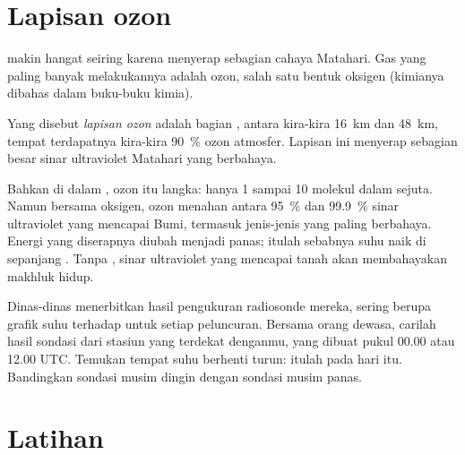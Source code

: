 \section{Lapisan ozon}

 makin hangat seiring  karena  menyerap
sebagian cahaya Matahari. Gas yang paling banyak melakukannya adalah ozon,
salah satu bentuk oksigen (kimianya dibahas dalam buku-buku kimia).

\begin{definition}\label{def:g8:the-atmosphere:ozone-layer}
Yang disebut \emph{lapisan ozon} adalah bagian
, antara kira-kira \qty{16}{km} dan \qty{48}{km}, tempat
terdapatnya kira-kira 90~\% ozon atmosfer. Lapisan ini menyerap sebagian
besar sinar ultraviolet Matahari yang berbahaya.
\end{definition}

Bahkan di dalam , ozon itu langka: hanya 1 sampai 10 molekul
dalam sejuta. Namun bersama oksigen, ozon menahan antara 95~\% dan
99.9~\% sinar ultraviolet yang mencapai Bumi, termasuk jenis-jenis yang
paling berbahaya. Energi yang diserapnya diubah menjadi panas; itulah
sebabnya suhu naik di sepanjang . Tanpa , sinar
ultraviolet yang mencapai tanah akan membahayakan makhluk hidup.

\begin{inthefield}
Dinas-dinas  menerbitkan hasil pengukuran radiosonde mereka, sering
berupa grafik suhu terhadap  untuk setiap peluncuran. Bersama
orang dewasa, carilah hasil sondasi dari stasiun yang terdekat denganmu,
yang dibuat pukul 00.00 atau 12.00 UTC. Temukan  tempat suhu
berhenti turun: itulah  pada hari itu. Bandingkan sondasi musim
dingin dengan sondasi musim panas.
\end{inthefield}

\section{Latihan}

